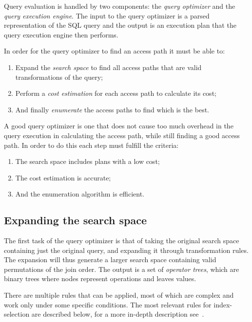 Query evaluation is handled by two components: the \textit{query optimizer} and the \textit{query execution engine}. The input to the query optimizer is a parsed representation of the SQL query and the output is an execution plan that the query execution engine then performs.

In order for the query optimizer to find an access path it must be able to:
\begin{enumerate}
    \item Expand the \textit{search space} to find all access paths that are valid transformations of the query;
    \item Perform a \textit{cost estimation} for each access path to calculate its cost;
    \item And finally \textit{enumerate} the access paths to find which is the best.
\end{enumerate}

A good query optimizer is one that does not cause too much overhead in the query execution in calculating the access path, while still finding a good access path. In order to do this each step must fulfill the criteria:
\begin{enumerate}
    \item The search space includes plans with a low cost;
    \item The cost estimation is accurate;
    \item And the enumeration algorithm is efficient.
\end{enumerate}

\subsection{Expanding the search space}
The first task of the query optimizer is that of taking the original search space containing just the original query, and expanding it through transformation rules. The expansion will thus generate a larger search space containing valid permutations of the join order. The output is a set of \textit{operator trees}, which are binary trees where nodes represent operations and leaves values.

There are multiple rules that can be applied, most of which are complex and work only under some specific conditions. The most relevant rules for index-selection are described below, for a more in-depth description see~\cite{chaudhuri_1998_overview_aooqoirs}.

